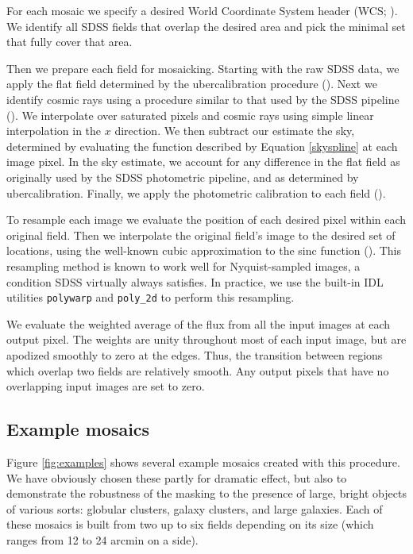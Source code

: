 \documentclass[10pt,preprint]{aastex}
\begin{document}
For each mosaic we specify a desired World Coordinate System header
(WCS; \citealt{greisen02a}). We identify all SDSS fields that overlap
the desired area and pick the minimal set that fully cover that area.

Then we prepare each field for mosaicking.  Starting with the raw SDSS
data, we apply the flat field determined by the ubercalibration
procedure (\citealt{padmanabhan07b}). Next we identify cosmic rays
using a procedure similar to that used by the SDSS pipeline
(\citealt{lupton01a}). We interpolate over saturated pixels and cosmic
rays using simple linear interpolation in the $x$ direction.  We then
subtract our estimate the sky, determined by evaluating the function
described by Equation \ref{skyspline} at each image pixel. In the sky
estimate, we account for any difference in the flat field as
originally used by the SDSS photometric pipeline, and as determined by
ubercalibration. Finally, we apply the photometric calibration to each
field (\citealt{padmanabhan07b}).

To resample each image we evaluate the position of each desired pixel
within each original field. Then we interpolate the original field's
image to the desired set of locations, using the well-known cubic
approximation to the sinc function (\citealt{park83a}). This
resampling method is known to work well for Nyquist-sampled images, a
condition SDSS virtually always satisfies. In practice, we use the
built-in IDL utilities {\tt polywarp} and {\tt poly\_2d} to perform
this resampling.

We evaluate the weighted average of the flux from all the input images
at each output pixel. The weights are unity throughout most of each
input image, but are apodized smoothly to zero at the edges. Thus, the
transition between regions which overlap two fields are relatively
smooth. Any output pixels that have no overlapping input images are
set to zero.

\subsection{Example mosaics}

Figure \ref{fig:examples} shows several example mosaics created with
this procedure.  We have obviously chosen these partly for dramatic
effect, but also to demonstrate the robustness of the masking to the
presence of large, bright objects of various sorts: globular clusters,
galaxy clusters, and large galaxies. Each of these mosaics is built
from two up to six fields depending on its size (which ranges from 12
to 24 arcmin on a side).
\end{document}
